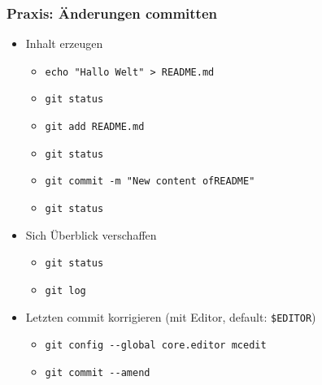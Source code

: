 \documentclass{beamer}
\begin{document}
\begin{frame}[label=gitintro40]
\frametitle{Praxis: Änderungen committen}
\begin{itemize}
 \item Inhalt erzeugen
\begin{itemize}
 \item \texttt{echo "{}Hallo Welt"{} > README.md}
 \item \texttt{git status}
 \item \texttt{git add README.md} \qquad {}
 \item \texttt{git status}
 \item \texttt{git commit -m "{}New content ofREADME"{}} \quad {}
 \item \texttt{git status}
\end{itemize}
 \bigskip
 \pause
 \pause
 \item Sich Überblick verschaffen
 \begin{itemize}
 \item \texttt{git status}
 \item \texttt{git log}
 \end{itemize}
 \pause
 \item Letzten commit korrigieren (mit Editor, default: \texttt{\$EDITOR})
 \begin{itemize}
 \item  \texttt{git config -{}-global core.editor mcedit}
 \item \texttt{git commit -{}-amend}
 \end{itemize}
\end{itemize}

\end{frame}
\end{document}
